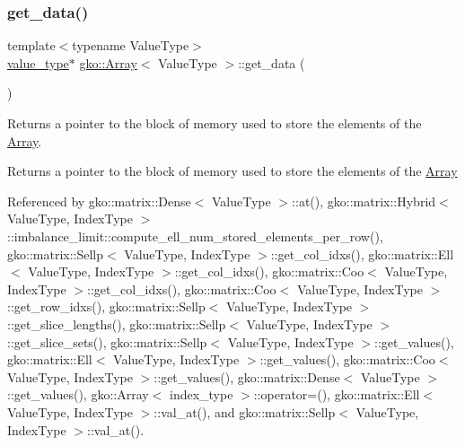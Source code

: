\mbox{\label{classgko_1_1Array_a9acf29878703bb8767e3cea2ba499dae}} 
\subsubsection{\texorpdfstring{get\+\_\+data()}{get\_data()}}
{\footnotesize\ttfamily template$<$typename Value\+Type$>$ \\
\hyperlink{classgko_1_1Array_ad40c95e429262175cae51bcabd291a5b}{value\+\_\+type}$\ast$ \hyperlink{classgko_1_1Array}{gko\+::\+Array}$<$ Value\+Type $>$\+::get\+\_\+data (\begin{DoxyParamCaption}{ }\end{DoxyParamCaption})\hspace{0.3cm}{\ttfamily [noexcept]}}



Returns a pointer to the block of memory used to store the elements of the \hyperlink{classgko_1_1Array}{Array}. 

\begin{DoxyReturn}{Returns}
a pointer to the block of memory used to store the elements of the \hyperlink{classgko_1_1Array}{Array} 
\end{DoxyReturn}


Referenced by gko\+::matrix\+::\+Dense$<$ Value\+Type $>$\+::at(), gko\+::matrix\+::\+Hybrid$<$ Value\+Type, Index\+Type $>$\+::imbalance\+\_\+limit\+::compute\+\_\+ell\+\_\+num\+\_\+stored\+\_\+elements\+\_\+per\+\_\+row(), gko\+::matrix\+::\+Sellp$<$ Value\+Type, Index\+Type $>$\+::get\+\_\+col\+\_\+idxs(), gko\+::matrix\+::\+Ell$<$ Value\+Type, Index\+Type $>$\+::get\+\_\+col\+\_\+idxs(), gko\+::matrix\+::\+Coo$<$ Value\+Type, Index\+Type $>$\+::get\+\_\+col\+\_\+idxs(), gko\+::matrix\+::\+Coo$<$ Value\+Type, Index\+Type $>$\+::get\+\_\+row\+\_\+idxs(), gko\+::matrix\+::\+Sellp$<$ Value\+Type, Index\+Type $>$\+::get\+\_\+slice\+\_\+lengths(), gko\+::matrix\+::\+Sellp$<$ Value\+Type, Index\+Type $>$\+::get\+\_\+slice\+\_\+sets(), gko\+::matrix\+::\+Sellp$<$ Value\+Type, Index\+Type $>$\+::get\+\_\+values(), gko\+::matrix\+::\+Ell$<$ Value\+Type, Index\+Type $>$\+::get\+\_\+values(), gko\+::matrix\+::\+Coo$<$ Value\+Type, Index\+Type $>$\+::get\+\_\+values(), gko\+::matrix\+::\+Dense$<$ Value\+Type $>$\+::get\+\_\+values(), gko\+::\+Array$<$ index\+\_\+type $>$\+::operator=(), gko\+::matrix\+::\+Ell$<$ Value\+Type, Index\+Type $>$\+::val\+\_\+at(), and gko\+::matrix\+::\+Sellp$<$ Value\+Type, Index\+Type $>$\+::val\+\_\+at().

